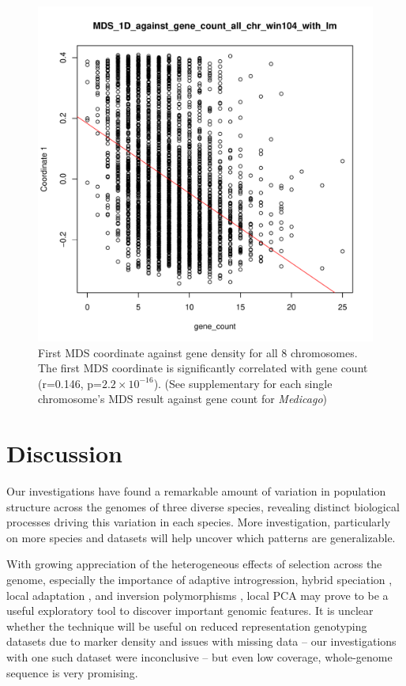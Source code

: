 \documentclass[11pt, oneside]{article}   	%
\begin{document}
\begin{figure}
    \begin{center}
       \includegraphics{Fig6_MDS_1D_against_gene_count_all_chr_win104_with_lm}
    \end{center}
    \caption{
        First MDS coordinate against gene density for all 8 chromosomes. 
        The first MDS coordinate is significantly correlated with gene count (r=0.146, p=$2.2\times 10^{-16}$). 
        (See supplementary for each single chromosome's MDS result against gene count for \textit{Medicago})
        \label{fig:mds_gene_count}
    }
\end{figure}

\section{Discussion}

Our investigations have found a remarkable amount of variation in population structure across the genomes
of three diverse species,
revealing distinct biological processes driving this variation in each species.
More investigation, particularly on more species and datasets will help uncover which patterns are generalizable.

With growing appreciation of the heterogeneous effects of selection across the genome,
especially the importance of adaptive introgression, hybrid speciation \citep{pool2015natural,brandvain2014speciation,hufford2013genomic,fitzpatrick2010rapid,staubach2012genome},
local adaptation \citep{lenormand2002limits,wang2014isolation},
and inversion polymorphisms \citep{kirkpatrick2015chromosome,kirkpatrick2010chromosome},
local PCA may prove to be a useful exploratory tool to discover important genomic features.
It is unclear whether the technique will be useful on reduced representation genotyping datasets 
due to marker density and issues with missing data --
our investigations with one such dataset were inconclusive --
but even low coverage, whole-genome sequence is very promising.
\end{document}
